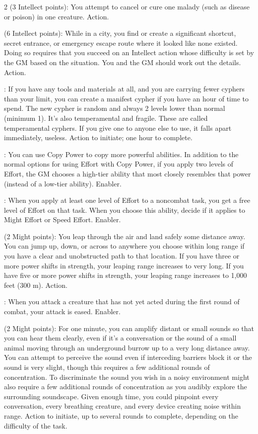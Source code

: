 \begin{multicols}{2}
 (3 Intellect points): You attempt to cancel or cure one malady (such as disease or poison) in one creature. Action. 

 (6 Intellect points): While in a city, you find or create a significant shortcut, secret entrance, or emergency escape route where it looked like none existed. Doing so requires that you succeed on an Intellect action whose difficulty is set by the GM based on the situation. You and the GM should work out the details. Action. 

: If you have any tools and materials at all, and you are carrying fewer cyphers than your limit, you can create a manifest cypher if you have an hour of time to spend. The new cypher is random and always 2 levels lower than normal (minimum 1). It’s also temperamental and fragile. These are called temperamental cyphers. If you give one to anyone else to use, it falls apart immediately, useless. Action to initiate; one hour to complete.

: You can use Copy Power to copy more powerful abilities. In addition to the normal options for using Effort with Copy Power, if you apply two levels of Effort, the GM chooses a high-tier ability that most closely resembles that power (instead of a low-tier ability). Enabler.

: When you apply at least one level of Effort to a noncombat task, you get a free level of Effort on that task. When you choose this ability, decide if it applies to Might Effort or Speed Effort. Enabler. 

 (2 Might points): You leap through the air and land safely some distance away. You can jump up, down, or across to anywhere you choose within long range if you have a clear and unobstructed path to that location. If you have three or more power shifts in strength, your leaping range increases to very long. If you have five or more power shifts in strength, your leaping range increases to 1,000 feet (300 m). Action.

: When you attack a creature that has not yet acted during the first round of combat, your attack is eased. Enabler. 

 (2 Might points): For one minute, you can amplify distant or small sounds so that you can hear them clearly, even if it’s a conversation or the sound of a small animal moving through an underground burrow up to a very long distance away. You can attempt to perceive the sound even if interceding barriers block it or the sound is very slight, though this requires a few additional rounds of concentration. To discriminate the sound you wish in a noisy environment might also require a few additional rounds of concentration as you audibly explore the surrounding soundscape. Given enough time, you could pinpoint every conversation, every breathing creature, and every device creating noise within range. Action to initiate, up to several rounds to complete, depending on the difficulty of the task. 


\end{multicols}
